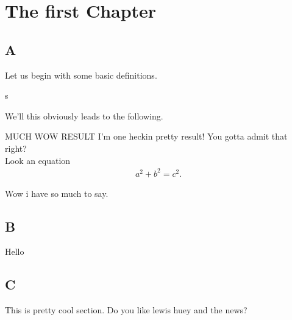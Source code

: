 \chapter{The first Chapter}\label{ch:One}
\section{A}
Let us begin with some basic definitions.
\begin{definition}{}{}
s
\end{definition}
We'll this obviously leads to the following.
\begin{theorem}{MUCH WOW RESULT}{}
I'm one heckin pretty result! You gotta admit that right?\\
Look an equation
\begin{align*}
a^2+b^2=c^2.
\end{align*}
\end{theorem}

Wow i have so much to say.\newpage

\section{B}
Hello
\section{C}
This is pretty cool section.\newpage
Do you like lewis huey and the news?